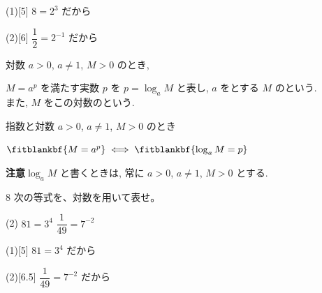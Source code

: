\documentclass[14pt,dvipdfmx]{jsarticle}
\begin{document}
\begin{answerbox}{(1)}[5]
  $8=2^3$ だから
\end{answerbox}
\begin{answerbox}{(2)}[6]
  $\dfrac{1}{2}=2^{-1}$ だから
\end{answerbox}

\vspace{0.25em}

\begin{definitionbox}{対数}
  $a > 0$, $a \neq 1$, $M > 0$ のとき,

  $M = a^p$ を満たす実数 $p$ を $p = \log_{a} M$ と表し,
  $a$ をとする $M$ のという.\\
  また, $M$ をこの対数のという.
\end{definitionbox}

\vspace{0.1em}
\begin{theorembox}{指数と対数}
  $a > 0$, $a \neq 1$, $M > 0$ のとき
  \par\vspace{0.25em}
  {\centering
  $\fitblankbf{M = a^p} \iff \fitblankbf{\log_{a} M = p}$
  \par}
\end{theorembox}

\vspace{0.08em}
\textbf{注意}\quad $\log_{a} M$ と書くときは, 常に $a>0$, $a \neq 1$, $M>0$ とする.

\vfill
\nextpage

\vspace{-1.5zw}%
\begin{exampleprob}{8}
  次の等式を、対数を用いて表せ。
  \begin{tasks}[label=(\arabic*), label-width=1.6zw, item-indent=2zw, after-item-skip=0.15em](2)
    \task $81 = 3^4$
    \task $\dfrac{1}{49} = 7^{-2}$
  \end{tasks}
\end{exampleprob}

\begin{answerbox}{(1)}[5]
  $81=3^4$ だから
\end{answerbox}
\begin{answerbox}{(2)}[6.5]
  $\dfrac{1}{49}=7^{-2}$ だから
\end{answerbox}
\end{document}
